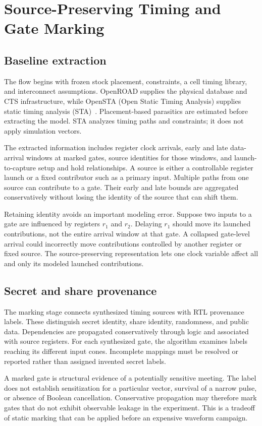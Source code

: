 \documentclass[conference]{IEEEtran}
\begin{document}
\section{Source-Preserving Timing and Gate Marking}
\subsection{Baseline extraction}
The flow begins with frozen stock placement, constraints, a cell timing library, and interconnect assumptions. OpenROAD supplies the physical database and CTS infrastructure, while OpenSTA (Open Static Timing Analysis) supplies static timing analysis (STA)~\cite{sta,cts}. Placement-based parasitics are estimated before extracting the model. STA analyzes timing paths and constraints; it does not apply simulation vectors.

The extracted information includes register clock arrivals, early and late data-arrival windows at marked gates, source identities for those windows, and launch-to-capture setup and hold relationships. A source is either a controllable register launch or a fixed contributor such as a primary input. Multiple paths from one source can contribute to a gate. Their early and late bounds are aggregated conservatively without losing the identity of the source that can shift them.

Retaining identity avoids an important modeling error. Suppose two inputs to a gate are influenced by registers $r_1$ and $r_2$. Delaying $r_1$ should move its launched contributions, not the entire arrival window at that gate. A collapsed gate-level arrival could incorrectly move contributions controlled by another register or fixed source. The source-preserving representation lets one clock variable affect all and only its modeled launched contributions.

\subsection{Secret and share provenance}
The marking stage connects synthesized timing sources with RTL provenance labels. These distinguish secret identity, share identity, randomness, and public data. Dependencies are propagated conservatively through logic and associated with source registers. For each synthesized gate, the algorithm examines labels reaching its different input cones. Incomplete mappings must be resolved or reported rather than assigned invented secret labels.

A marked gate is structural evidence of a potentially sensitive meeting. The label does not establish sensitization for a particular vector, survival of a narrow pulse, or absence of Boolean cancellation. Conservative propagation may therefore mark gates that do not exhibit observable leakage in the experiment. This is a tradeoff of static marking that can be applied before an expensive waveform campaign.
\end{document}
